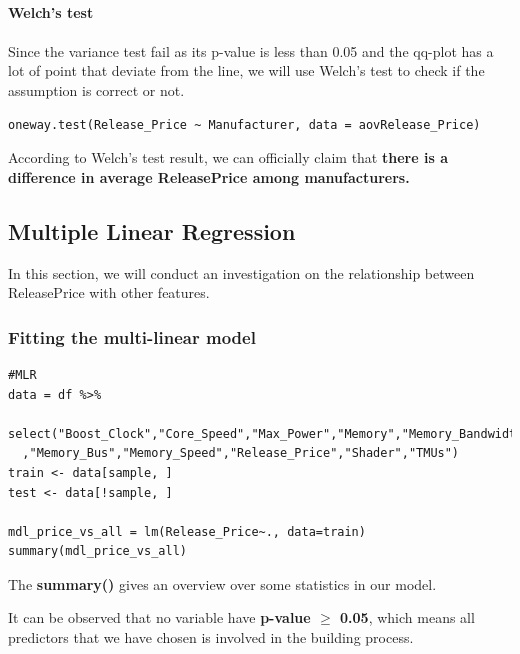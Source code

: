 \documentclass[a4paper]{article}
\let\ge=\geq
\theoremstyle{definition}
\begin{document}
\\
\textbf{Welch's test}\\
\\
Since the variance test fail as its p-value is less than 0.05 and the qq-plot has a lot of point that deviate from the line, we will use Welch's test to check if the assumption is correct or not.
\begin{mdframed}[leftline=false,rightline=false,backgroundcolor=lightblue!10,nobreak=false]
    \begin{verbatim}
oneway.test(Release_Price ~ Manufacturer, data = aovRelease_Price)
    \end{verbatim}
\end{mdframed}

According to Welch's test result, we can officially claim that \textbf{there is a difference in average Release\textunderscore Price among manufacturers.}

\subsection{Multiple Linear Regression}
In this section, we will conduct an investigation on the relationship between Release\textunderscore Price with other features.
\subsubsection{Fitting the multi-linear model}
\begin{mdframed}[leftline=false,rightline=false,backgroundcolor=lightblue!10,nobreak=false]
    \begin{verbatim}
#MLR
data = df %>%
  select("Boost_Clock","Core_Speed","Max_Power","Memory","Memory_Bandwidth"
  ,"Memory_Bus","Memory_Speed","Release_Price","Shader","TMUs")
train <- data[sample, ]
test <- data[!sample, ]

mdl_price_vs_all = lm(Release_Price~., data=train)
summary(mdl_price_vs_all)
    \end{verbatim}
\end{mdframed}
The \textbf{summary()} gives an overview over some statistics in our model.

It can be observed that no variable have \textbf{p-value $\ge$ 0.05}, which means all predictors that we have chosen is involved in the building process.
\end{document}
